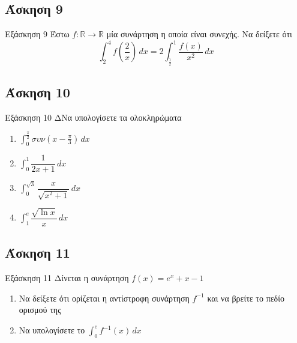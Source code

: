 \documentclass[greek]{beamer}
\begin{document}
\subsection{Άσκηση 9}
\begin{frame}[label=Άσκηση9,t]{Εξάσκηση 9}
 Έστω $f:\mathbb{R}\to\mathbb{R}$ μία συνάρτηση η οποία είναι συνεχής. Να δείξετε ότι
 $$\int_{2}^{4} f\left( \dfrac{2}{x} \right)  \,dx=2\int_{\frac{1}{2}}^{1} \dfrac{f(x)}{x^2} \,dx$$

\end{frame}

\subsection{Άσκηση 10}
\begin{frame}[label=Άσκηση10,t]{Εξάσκηση 10}
 ΔΝα υπολογίσετε τα ολοκληρώματα
 \begin{enumerate}
  \item<1-> $\int_{0}^{\frac{π}{2}} συν(x-\frac{π}{3}) \,dx$
  \item<2-> $\int_{0}^{1} \dfrac{1}{2x+1} \,dx$
  \item<3-> $\int_{0}^{\sqrt{3}} \dfrac{x}{\sqrt{x^2+1}} \,dx$
  \item<4-> $\int_{1}^{e} \dfrac{\sqrt{\ln x}}{x} \,dx$
 \end{enumerate}

\end{frame}

\subsection{Άσκηση 11}
\begin{frame}[label=Άσκηση11,,t]{Εξάσκηση 11}
 Δίνεται η συνάρτηση $f(x)=e^x+x-1$
 \begin{enumerate}
   \item<1-> Να δείξετε ότι ορίζεται η αντίστροφη συνάρτηση $f^{-1}$ και να βρείτε το πεδίο ορισμού της
   \item<2-> Να υπολογίσετε το $\int_{0}^{e} f^{-1}(x) \,dx$
 \end{enumerate} 

\end{frame}
\end{document}
